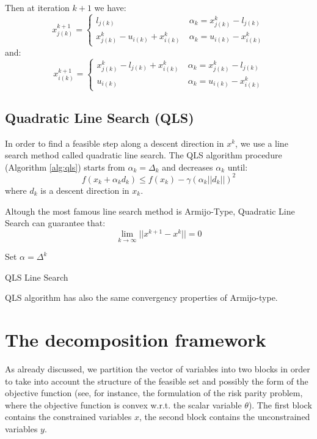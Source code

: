 Then at iteration $k+1$ we have:
\begin{equation*}
x^{k+1}_{j(k)}=\begin{cases}
 l_{j(k)} \ &\alpha_k=x^k_{j(k)}-l_{j(k)}\\
 x^k_{j(k)}-u_{i(k)} +x^k_{i(k)} \ &\alpha_k=u_{i(k)} -x^k_{i(k)}
 \end{cases}
\end{equation*}
and:
\begin{equation*}
x^{k+1}_{i(k)}=\begin{cases}
 x^k_{j(k)}-l_{j(k)}+x^k_{i(k)} \ &\alpha_k=x^k_{j(k)}-l_{j(k)}\\
 u_{i(k)} \ &\alpha_k=u_{i(k)}-x^k_{i(k)}
 \end{cases}
\end{equation*}
\subsection{Quadratic Line Search (QLS)}
In order to find a feasible step along a descent direction in $x^k$, we use a line search method called quadratic line search. The QLS algorithm procedure (Algorithm \ref{alg:qls}) starts from $\alpha_k = \Delta_k$ and decreases $\alpha_k$ until:
\begin{equation}
f(x_k+\alpha_kd_k) \le  f(x_k)- \gamma (\alpha_k||d_k||)^2
\end{equation}
 where $d_k$ is a descent direction in $x_k$.

Altough the most famous line search method is Armijo-Type, Quadratic Line Search can guarantee that:
\begin{equation}
 \displaystyle \lim_{k\rightarrow \infty} ||x^{k+1}-x^{k}|| =0
\end{equation}

 \begin{algorithm}[ht]
 Set $\alpha = \Delta^{k}$\\
 \caption{QLS Line Search}\label{alg:qls}
\end{algorithm}

QLS algorithm has also the same convergency properties \cite{sciandrone-galligari-dilorenzo} of Armijo-type.
\section{The decomposition framework}
As already discussed, we partition the vector of variables into two blocks in order to take into account
the structure of the feasible set and possibly the form of the objective function (see, for instance,
the formulation of the risk parity problem, where the objective function is convex w.r.t. the scalar variable $\theta$).
The first block contains the constrained variables $x$, the second block contains
the unconstrained variables $y$. 

